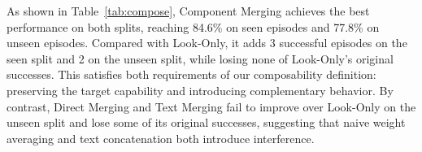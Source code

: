 As shown in Table~\ref{tab:compose}, Component Merging achieves the best performance on both splits, reaching 84.6\% on seen episodes and 77.8\% on unseen episodes. Compared with Look-Only, it adds 3 successful episodes on the seen split and 2 on the unseen split, while losing none of Look-Only's original successes. This satisfies both requirements of our composability definition: preserving the target capability and introducing complementary behavior. By contrast, Direct Merging and Text Merging fail to improve over Look-Only on the unseen split and lose some of its original successes, suggesting that naive weight averaging and text concatenation both introduce interference.

